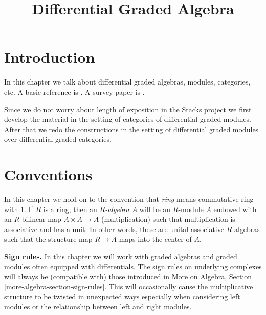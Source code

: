 

%


\title{Differential Graded Algebra}


\maketitle

\label{section-phantom}

\tableofcontents

\section{Introduction}
\label{section-introduction}

\noindent
In this chapter we talk about differential graded algebras, modules,
categories, etc. A basic reference is \cite{Keller-Deriving}.
A survey paper is \cite{Keller-survey}.

\medskip\noindent
Since we do not worry about length of exposition in the Stacks project
we first develop the material in the setting of categories of differential
graded modules. After that we redo the constructions in the setting of
differential graded modules over differential graded categories.



\section{Conventions}
\label{section-conventions}

\noindent
In this chapter we hold on to the convention that {\it ring} means
commutative ring with $1$. If $R$ is a ring, then an {\it $R$-algebra $A$}
will be an $R$-module $A$ endowed with an $R$-bilinear map $A \times A \to A$
(multiplication) such that multiplication is associative and has a unit.
In other words, these are unital associative $R$-algebras
such that the structure map $R \to A$ maps into the center of $A$.

\medskip\noindent
{\bf Sign rules.} In this chapter we will work with graded algebras
and graded modules often equipped with differentials. The sign rules on
underlying complexes will always be (compatible with) those introduced in
More on Algebra, Section \ref{more-algebra-section-sign-rules}.
This will occasionally cause the multiplicative structure to be
twisted in unexpected ways especially when considering left modules
or the relationship between left and right modules.





